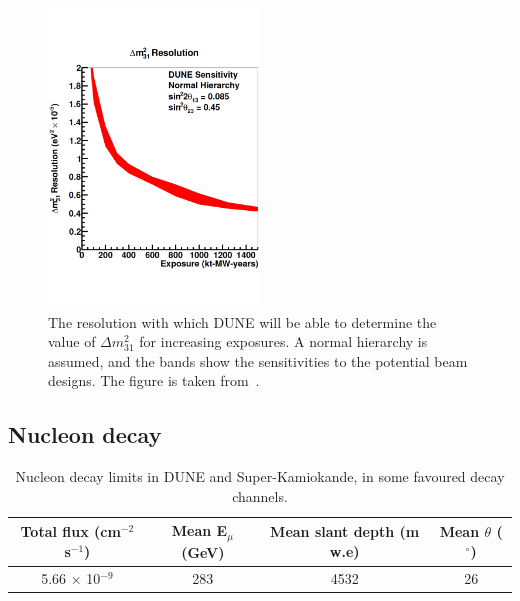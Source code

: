 \begin{figure}[h!]
  \centering
  \includegraphics[width=0.5\textwidth]{DUNEDeltaMRes}
  \caption[The resolution with which DUNE will be able to determine the value of $\Delta m^{2}_{31}$ for increasing exposures]
          {The resolution with which DUNE will be able to determine the value of $\Delta m^{2}_{31}$ for increasing exposures. A normal hierarchy is assumed, and the bands show the sensitivities to the potential beam designs. The figure is taken from~\citep{DUNECDR_V2}.}
  \label{fig:DUNEDeltaMRes}
\end{figure}


\subsection{Nucleon decay} \label{sec:DUNE_NDK}%

\begin{table}[h!]
\caption[Nucleon decay limits in DUNE and Super-Kamiokande]
        {Nucleon decay limits in DUNE and Super-Kamiokande, in some favoured decay channels.}
\centering
\label{tab:NDKLim}
\begin{tabular}{c c c c}
\toprule
{Total flux (cm$^{-2}$ s$^{-1}$)} & {Mean E$_{\mu}$ (GeV)} & {Mean slant depth (m w.e)} & {Mean $\theta$ ($^{\circ}$)} \\ 
\midrule
5.66 $\times$ 10$^{-9}$           & 283                    & 4532                       & 26                           \\
\bottomrule
\end{tabular}
\end{table}

